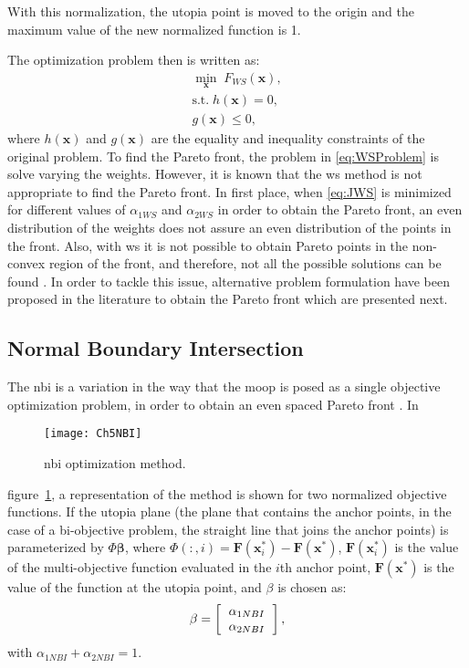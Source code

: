 With this normalization, the utopia point is moved to the origin and the maximum value of the new normalized function is 1.

The optimization problem then is written as:
\begin{equation}
\begin{gathered}
\min_{\mathbf{x}}{\; F_{WS}(\mathbf{x})}, \\
\text{s.t.} \; h(\mathbf{x})=0, \\
g(\mathbf{x}) \leq 0,
\end{gathered}
\label{eq:WSProblem}
\end{equation}
%
where $h(\mathbf{x})$ and $g(\mathbf{x})$ are the equality and inequality constraints of the original problem. To find the Pareto front, the problem in \eqref{eq:WSProblem} is solve varying the weights. However, it is known that the \gls{ws} method is not appropriate to find the Pareto front. In first place, when \eqref{eq:JWS} is minimized for different values of $\alpha_{1WS}$ and $\alpha_{2WS}$ in order to obtain the Pareto front, an even distribution of the weights does not assure an even distribution of the points in the front. Also, with \gls{ws} it is not possible to obtain Pareto points in the non-convex region of the front, and therefore, not all the possible solutions can be found \citep{Das1997}. In order to tackle this issue, alternative problem formulation have been proposed in the literature to obtain the Pareto front which are presented next.
\subsection{Normal Boundary Intersection}
\label{sec:NBI}
%
The \gls{nbi} is a variation in the way that the \gls{moop} is posed as a single objective optimization problem, in order to obtain an even spaced Pareto front \citep{Das1998}. In %
%
\begin{figure}[b]%
	\centering
	\texttt{[image: Ch5NBI]}%
	\caption{\gls{nbi} optimization method.}%
	\label{fig:NBI}%
\end{figure}
%
figure~\ref{fig:NBI}, a representation of the method is shown for two normalized objective functions. If the utopia plane (the plane that contains the anchor points, in the case of a bi-objective problem, the straight line that joins the anchor points) is parameterized by $\Phi\mathbf{\beta}$, where $\Phi(:,i)=\mathbf{F}(\mathbf{x}_i^*)-\mathbf{F}(\mathbf{x}^*)$, $\mathbf{F}(\mathbf{x}_i^*)$ is the value of the multi-objective function evaluated in the $i$th anchor point, $\mathbf{F}(\mathbf{x}^*)$ is the value of the function at the utopia point, and $\beta$ is chosen as:
\begin{equation}
\beta=
\left[\begin{tabular}{c}
$\alpha_{1NBI}$ \\ $\alpha_{2NBI}$
\end{tabular}\right],
\label{eq:Beta}
\end{equation}
with $\alpha_{1NBI}+\alpha_{2NBI}=1$.

